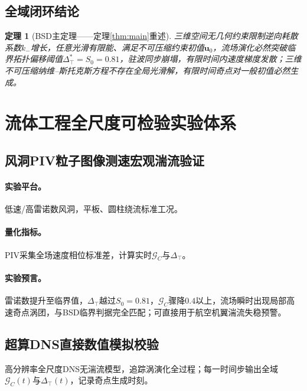 \documentclass[11pt,a4paper]{ctexart}
\newtheorem{theorem}{定理}
\theoremstyle{remark}
\newcommand{\kminus}{k_{-}}
\newcommand{\Szero}{S_{0}}
\newcommand{\GC}{\mathcal{G}_{\!C}}
\newcommand{\Dtop}{\Delta_{\!\top}}
\newcommand{\uvec}{\bm{u}}
\begin{document}
\subsection{全域闭环结论}\label{sec:closed}

\begin{theorem}[BSD主定理——定理\ref{thm:main}重述]\label{thm:bsd-main}
三维空间无几何约束限制逆向耗散系数$\kminus$增长，任意光滑有限能、满足不可压缩约束初值$\uvec_{0}$，流场演化必然突破临界拓扑偏移阈值$\Dtop^{*}=\Szero=0.81$，驻波同步崩塌，有限时间内速度梯度发散；三维不可压缩纳维--斯托克斯方程不存在全局光滑解，有限时间奇点对一般初值必然生成。
\end{theorem}

\section{流体工程全尺度可检验实验体系}\label{sec:experiment}

\subsection{风洞PIV粒子图像测速宏观湍流验证}\label{sec:piv}

\paragraph{实验平台。} 低速/高雷诺数风洞，平板、圆柱绕流标准工况。

\paragraph{量化指标。} PIV采集全场速度相位标准差，计算实时$\GC$与$\Dtop$。

\paragraph{实验预言。} 雷诺数提升至临界值，$\Dtop$越过$\Szero=0.81$，$\GC$骤降$0.4$以上，流场瞬时出现局部高速奇点涡团，与BSD临界判据完全匹配；可直接用于航空机翼湍流失稳预警。

\subsection{超算DNS直接数值模拟校验}\label{sec:dns}

高分辨率全尺度DNS无湍流模型，追踪涡演化全过程；每一时间步输出全域$\GC(t)$与$\Dtop(t)$，记录奇点生成时刻。
\end{document}
